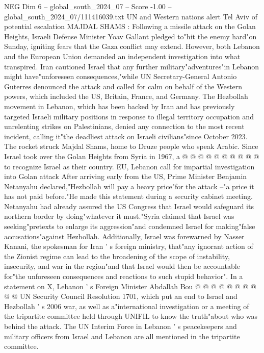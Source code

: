 \begin{textsample}{NEG Dim 6 – global\_south\_2024\_07 – Score -1.00 – global\_south\_2024\_07/111416039.txt}  \label{ex:f6_neg_133}
UN and Western nations alert Tel Aviv of potential escalation MAJDAL SHAMS : Following a missile attack on the Golan Heights, Israeli Defense Minister Yoav Gallant pledged to"hit the enemy hard"on Sunday, igniting fears that the Gaza conflict may extend.
However, both Lebanon and the European Union demanded an independent investigation into what transpired.
Iran cautioned Israel that any further military"adventures"in Lebanon might have"unforeseen consequences,"while UN Secretary-General Antonio Guterres denounced the attack and called for calm on behalf of the Western powers, which included the US, Britain, France, and Germany.
The Hezbollah movement in Lebanon, which has been backed by Iran and has previously targeted Israeli military positions in response to illegal territory occupation and unrelenting strikes on Palestinians, denied any connection to the most recent incident, calling it"the deadliest attack on Israeli civilians"since October 2023.
The rocket struck Majdal Shams, home to Druze people who speak Arabic.
Since Israel took over the Golan Heights from Syria in 1967, a @ @ @ @ @ @ @ @ @ @ to recognize Israel as their country.
EU, Lebanon call for impartial investigation into Golan attack After arriving early from the US, Prime Minister Benjamin Netanyahu declared,"Hezbollah will pay a heavy price"for the attack --"a price it has not paid before."He made this statement during a security cabinet meeting.
Netanyahu had already assured the US Congress that Israel would safeguard its northern border by doing"whatever it must."Syria claimed that Israel was seeking"pretexts to enlarge its aggression"and condemned Israel for making"false accusations"against Hezbollah.
Additionally, Israel was forewarned by Nasser Kanani, the spokesman for Iran ' s foreign ministry, that"any ignorant action of the Zionist regime can lead to the broadening of the scope of instability, insecurity, and war in the region"and that Israel would then be accountable for"the unforeseen consequences and reactions to such stupid behavior".
In a statement on X, Lebanon ' s Foreign Minister Abdallah Bou @ @ @ @ @ @ @ @ @ @ UN Security Council Resolution 1701, which put an end to Israel and Hezbollah ' s 2006 war, as well as a"international investigation or a meeting of the tripartite committee held through UNIFIL to know the truth"about who was behind the attack.
The UN Interim Force in Lebanon ' s peacekeepers and military officers from Israel and Lebanon are all mentioned in the tripartite committee.

\end{textsample}
